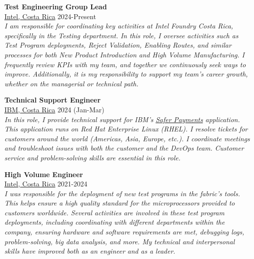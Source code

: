     \begin{tcolorbox}[title=Experience \faBriefcase, colframe=blue!25!black]

        \textbf{Test Engineering Group Lead}\\
        \faMapMarker \hspace{0mm} \href{https://www.intel.com/content/www/us/en/corporate-responsibility/intel-in-costa-rica.html}{Intel, Costa Rica}  \hspace{11.5cm} \faCalendar \hspace{0mm} 2024-Present \\
        \textit{I am responsible for coordinating key activities at Intel Foundry Costa Rica, specifically in the Testing department. In this role, I oversee activities such as Test Program deployments, Reject Validation, Enabling Routes, and similar processes for both New Product Introduction and High Volume Manufacturing. I frequently review KPIs with my team, and together we continuously seek ways to improve. Additionally, it is my responsibility to support my team’s career growth, whether on the managerial or technical path.}
        
        \tcbline

        \textbf{Technical Support Engineer}\\
        \faMapMarker \hspace{0mm} \href{https://www.ibm.com/mx-es}{IBM, Costa Rica}  \hspace{11.5cm} \faCalendar \hspace{0mm} 2024 (Jan-Mar) \\
        \textit{In this role, I provide technical support for IBM’s \href{https://www.ibm.com/products/safer-payments}{Safer Payments} application. This application runs on Red Hat Enterprise Linux (RHEL). I resolve tickets for customers around the world (Americas, Asia, Europe, etc.). I coordinate meetings and troubleshoot issues with both the customer and the DevOps team. Customer service and problem-solving skills are essential in this role.}
        
        \tcbline
        
        \textbf{High Volume Engineer}\\
        \faMapMarker \hspace{0mm} \href{https://www.intel.com/content/www/us/en/corporate-responsibility/intel-in-costa-rica.html}{Intel, Costa Rica}  \hspace{11.6cm} \faCalendar \hspace{0mm} 2021-2024 \\
        \textit{I was responsible for the deployment of new test programs in the fabric's tools. This helps ensure a high quality standard for the microprocessors provided to customers worldwide. Several activities are involved in these test program deployments, including coordinating with different departments within the company, ensuring hardware and software requirements are met, debugging logs, problem-solving, big data analysis, and more. My technical and interpersonal skills have improved both as an engineer and as a leader.}
        

\end{tcolorbox}
